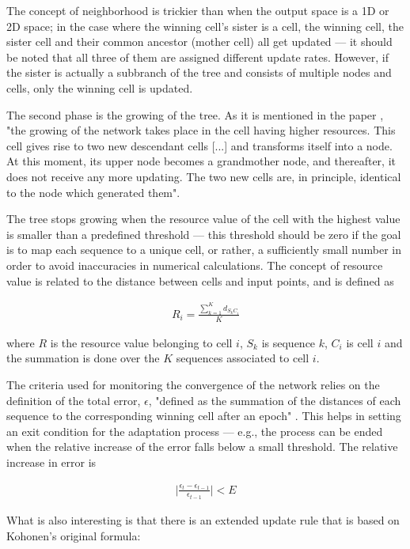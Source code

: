 \documentclass[11pt,twocolumn]{article}
\begin{document}
The concept of neighborhood is trickier than when the output space is a 1D or 2D space; in the case where the winning cell's sister is a cell, the winning cell, the sister cell and their common ancestor (mother cell) all get updated — it should be noted that all three of them are assigned different update rates. However, if the sister is actually a subbranch of the tree and consists of multiple nodes and cells, only the winning cell is updated.

The second phase is the growing of the tree. As it is mentioned in the paper \cite{Dopazo1997}, "the growing of the network takes place in the cell having higher resources. This cell gives rise to two new descendant cells [...] and transforms itself into a node. At this moment, its upper node becomes a grandmother node, and thereafter, it does not receive any more updating. The two new cells are, in principle, identical to the node which generated them".

The tree stops growing when the resource value of the cell with the highest value is smaller than a predefined threshold — this threshold should be zero if the goal is to map each sequence to a unique cell, or rather, a sufficiently small number in order to avoid inaccuracies in numerical calculations. The concept of resource value is related to the distance between cells and input points, and is defined as

\begin{align}
R_i = \frac{\sum_{k = 1}^K d_{S_k C_i}}{K}
\end{align}

where $R$ is the resource value belonging to cell $i$, $S_k$ is sequence $k$, $C_i$ is cell $i$ and the summation is done over the $K$ sequences associated to cell $i$.

The criteria used for monitoring the convergence of the network relies on the definition of the total error, $\epsilon$, "defined as the summation of the distances of each sequence to the corresponding winning cell after an epoch" \cite{Dopazo1997}. This helps in setting an exit condition for the adaptation process — e.g., the process can be ended when the relative increase of the error falls below a small threshold. The relative increase in error is

\begin{align}
\Big|\frac{\epsilon_t - \epsilon_{t-1}}{\epsilon_{t-1}}\Big| < E
\end{align}

What is also interesting is that there is an extended update rule that is based on Kohonen's original formula:
\end{document}
